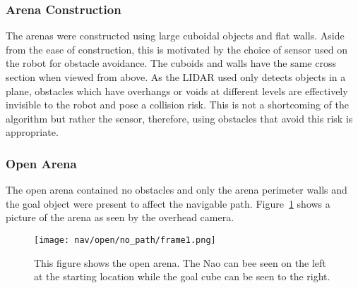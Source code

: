 \subsubsection{Arena Construction}
The arenas were constructed using large cuboidal objects and flat walls. Aside from the ease of
construction, this is motivated by the choice of sensor used on the robot for obstacle avoidance.
The cuboids and walls have the same cross section when viewed from above. As the LIDAR used
only detects objects in a plane, obstacles which have overhangs or voids at different levels
are effectively invisible to the robot and pose a collision risk. This is not a shortcoming of
the algorithm but rather the sensor, therefore, using obstacles that avoid this risk is appropriate.


\subsubsection{Open Arena}
The open arena contained no obstacles and only the arena perimeter walls and the goal
object were present to affect the navigable path.
Figure~\ref{fig:nav_open_setup1} shows a picture of the arena as seen by the overhead camera.

\begin{figure}
  \texttt{[image: nav/open/no\_path/frame1.png]}
  \caption{This figure shows the open arena. The Nao can bee seen on the left at the starting location
           while the goal cube can be seen to the right.
           }
  \label{fig:nav_open_setup1}
\end{figure}

